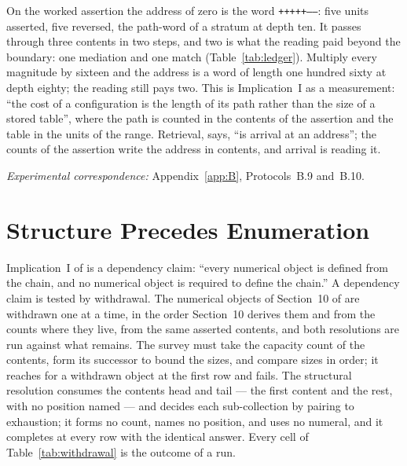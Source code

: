 \documentclass[pdflatex,sn-mathphys-num]{sn-jnl}
\theoremstyle{thmstyleone}%
\theoremstyle{thmstyletwo}%
\theoremstyle{thmstylethree}%
\newcommand{\PA}{\cite{Swanagon2026PA}}
\newcommand{\q}[1]{``#1''}        %
\begin{document}
\begin{table}[!htbp]
\centering\small
\caption{The two lengths of one path (Protocol~B.10). The address of zero grows with the magnitudes; the cost of arriving at it, one operation per step of the passage, does not. Operations under the one convention; the $n=12$ rows are the twenty-five assertions of Table~\ref{tab:magnitude}, means over those resolved, with the reading beyond the boundary including interior reads where no cell coincides.}
\label{tab:pathword}

\end{table}

On the worked assertion the address of zero is the word \texttt{+++++-----}: five units asserted, five reversed, the path-word of a stratum at depth ten. It passes through three contents in two steps, and two is what the reading paid beyond the boundary: one mediation and one match (Table~\ref{tab:ledger}). Multiply every magnitude by sixteen and the address is a word of length one hundred sixty at depth eighty; the reading still pays two. This is Implication~I as a measurement: \q{the cost of a configuration is the length of its path rather than the size of a stored table}, where the path is counted in the contents of the assertion and the table in the units of the range. Retrieval, \PA{} says, \q{is arrival at an address}; the counts of the assertion write the address in contents, and arrival is reading it.

\noindent\emph{Experimental correspondence:} Appendix~\ref{app:B}, Protocols~B.9 and~B.10.

\section{Structure Precedes Enumeration}\label{sec:precedence}
Implication~I of \PA{} is a dependency claim: \q{every numerical object is defined from the chain, and no numerical object is required to define the chain.} A dependency claim is tested by withdrawal. The numerical objects of Section~10 of \PA{} are withdrawn one at a time, in the order Section~10 derives them and from the counts where they live, from the same asserted contents, and both resolutions are run against what remains. The survey must take the capacity count of the contents, form its successor to bound the sizes, and compare sizes in order; it reaches for a withdrawn object at the first row and fails. The structural resolution consumes the contents head and tail --- the first content and the rest, with no position named --- and decides each sub-collection by pairing to exhaustion; it forms no count, names no position, and uses no numeral, and it completes at every row with the identical answer. Every cell of Table~\ref{tab:withdrawal} is the outcome of a run.
\end{document}
